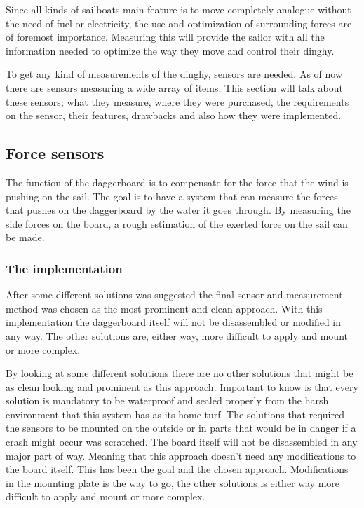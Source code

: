Since all kinds of sailboats main feature is to move completely analogue without the need of fuel or electricity, the use and optimization of surrounding forces are of foremost importance. Measuring this will provide the sailor with all the information needed to optimize the way they move and control their dinghy.

To get any kind of measurements of the dinghy, sensors are needed. As of now there are sensors measuring a wide array of items. This section will talk about these sensors; what they measure, where they were purchased, the requirements on the sensor, their features, drawbacks and also how they were implemented.

\subsection{Force sensors}
The function of the daggerboard is to compensate for the force that the wind is pushing on the sail. The goal is to have a system that can measure the forces that pushes on the daggerboard by the water it goes through. By measuring the side forces on the board, a rough estimation of the exerted force on the sail can be made.  

\subsubsection{The implementation}

After some different solutions was suggested the final sensor and measurement method was chosen as the most prominent and clean approach. 
With this implementation the daggerboard itself will not be disassembled or modified in any way. The other solutions are, either way, more difficult to apply and mount or more complex.  

By looking at some different solutions there are no other solutions that might be as clean looking and prominent as this approach. Important to know is that every solution is mandatory to be waterproof and sealed properly from the harsh environment that this system has as its home turf. The solutions that required the sensors to be mounted on the outside or in parts that would be in danger if a crash might occur was scratched.  
The board itself will not be disassembled in any major part of way. Meaning that this approach doesn’t need any modifications to the board itself. This has been the goal and the chosen approach. Modifications in the mounting plate is the way to go, the other solutions is either way more difficult to apply and mount or more complex.

